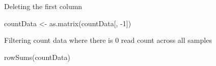 \documentclass[
]{article}
\newenvironment{Shaded}{\begin{snugshade}}{\end{snugshade}}
\newcommand{\DecValTok}[1]{\textcolor[rgb]{0.00,0.00,0.81}{#1}}
\newcommand{\FunctionTok}[1]{\textcolor[rgb]{0.00,0.00,0.00}{#1}}
\newcommand{\NormalTok}[1]{#1}
\newcommand{\OtherTok}[1]{\textcolor[rgb]{0.56,0.35,0.01}{#1}}
\newcommand{\SpecialCharTok}[1]{\textcolor[rgb]{0.00,0.00,0.00}{#1}}
\begin{document}
Deleting the first column

\begin{Shaded}
\begin{Highlighting}[]
\NormalTok{countData }\OtherTok{\textless{}{-}} \FunctionTok{as.matrix}\NormalTok{(countData[, }\SpecialCharTok{{-}}\DecValTok{1}\NormalTok{])}
\end{Highlighting}
\end{Shaded}

Filtering count data where there is 0 read count across all samples

\begin{Shaded}
\begin{Highlighting}[]
\FunctionTok{rowSums}\NormalTok{(countData)}
\end{Highlighting}
\end{Shaded}
\end{document}
